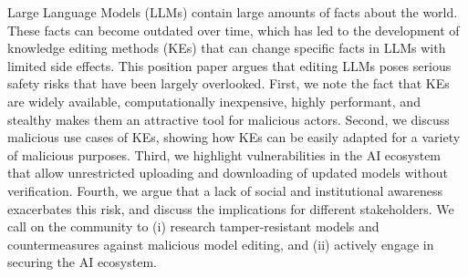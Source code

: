
Large Language Models (LLMs) contain large amounts of facts about the world. These facts can become outdated over time, which has led to the development of knowledge editing methods (KEs) that can change specific facts in LLMs with limited side effects. This position paper argues that editing LLMs poses serious safety risks that have been largely overlooked. First, we note the fact that KEs are widely available, computationally inexpensive, highly performant, and stealthy makes them an attractive tool for malicious actors. Second, we discuss malicious use cases of KEs, showing how KEs can be easily adapted for a variety of malicious purposes. Third, we highlight vulnerabilities in the AI ecosystem that allow unrestricted uploading and downloading of updated models without verification. Fourth, we argue that a lack of social and institutional awareness exacerbates this risk, and discuss the implications for different stakeholders. We call on the community to (i) research tamper-resistant models and countermeasures against malicious model editing, and (ii) actively engage in securing the AI ecosystem.

